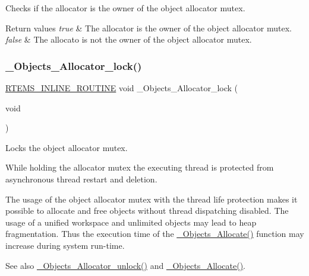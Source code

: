 Checks if the allocator is the owner of the object allocator mutex. 


\begin{DoxyRetVals}{Return values}
{\em true} & The allocator is the owner of the object allocator mutex. \\
\hline
{\em false} & The allocato is not the owner of the object allocator mutex. \\
\hline
\end{DoxyRetVals}
\mbox{\label{group__RTEMSScoreObject_ga3059733162454cc71ff73288ba9b4dfd}} 
\subsubsection{\texorpdfstring{\_Objects\_Allocator\_lock()}{\_Objects\_Allocator\_lock()}}
{\footnotesize\ttfamily \mbox{\hyperlink{group__RTEMSScoreBaseDefs_gac216239df231d5dbd15e3520b0b9313f}{R\+T\+E\+M\+S\+\_\+\+I\+N\+L\+I\+N\+E\+\_\+\+R\+O\+U\+T\+I\+NE}} void \+\_\+\+Objects\+\_\+\+Allocator\+\_\+lock (\begin{DoxyParamCaption}\item[{void}]{ }\end{DoxyParamCaption})}



Locks the object allocator mutex. 

While holding the allocator mutex the executing thread is protected from asynchronous thread restart and deletion.

The usage of the object allocator mutex with the thread life protection makes it possible to allocate and free objects without thread dispatching disabled. The usage of a unified workspace and unlimited objects may lead to heap fragmentation. Thus the execution time of the \mbox{\hyperlink{group__RTEMSScoreObject_ga3978b5150ea104a85bb28db0585ae000}{\+\_\+\+Objects\+\_\+\+Allocate()}} function may increase during system run-\/time.

\begin{DoxySeeAlso}{See also}
\mbox{\hyperlink{group__RTEMSScoreObject_ga41a6751fdfbe5adc5f9cb5d12cc8a214}{\+\_\+\+Objects\+\_\+\+Allocator\+\_\+unlock()}} and \mbox{\hyperlink{group__RTEMSScoreObject_ga3978b5150ea104a85bb28db0585ae000}{\+\_\+\+Objects\+\_\+\+Allocate()}}. 
\end{DoxySeeAlso}
\mbox{\label{group__RTEMSScoreObject_ga41a6751fdfbe5adc5f9cb5d12cc8a214}} 
